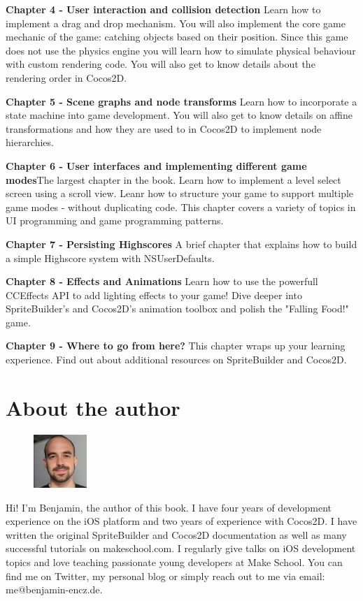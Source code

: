 \textbf{Chapter 4 - User interaction and collision detection}\newline
Learn how to implement a drag and drop mechanism. You will also implement the core game mechanic of the game: catching objects based on their position. Since this game does not use the physics engine you will learn how to simulate physical behaviour with custom rendering code. You will also get to know details about the rendering order in Cocos2D.


\textbf{Chapter 5 - Scene graphs and node transforms}\newline
Learn how to incorporate a state machine into game development. You will also get to know details on affine transformations and how they are used to in Cocos2D to implement node hierarchies.


\textbf{Chapter 6 - User interfaces and implementing different game
modes}\newline The largest chapter in the book. Learn how to implement a level select screen using a scroll view. Leanr how to structure your game to support multiple game modes - without duplicating code. This chapter covers a variety of topics in UI programming and game programming patterns.


\textbf{Chapter 7 - Persisting Highscores}\newline
A brief chapter that explains how to build a simple Highscore system with NSUserDefaults.


\textbf{Chapter 8 - Effects and Animations}\newline
Learn how to use the powerfull CCEffects API to add lighting effects to your game! Dive deeper into SpriteBuilder's and Cocos2D's animation toolbox and polish the "Falling Food!" game.


\textbf{Chapter 9 - Where to go from here?}\newline
This chapter wraps up your learning experience. Find out about additional resources on SpriteBuilder and Cocos2D.

\section{About the author}
\begin{figure}
    \includegraphics[width=0.18\textwidth]{images/Chapter1/benji.png}
\end{figure}
Hi! I'm Benjamin, the author of this book. I have four years of development experience on the iOS platform and two years of experience with Cocos2D.
I have written the original SpriteBuilder and Cocos2D documentation as well as many successful tutorials on makeschool.com. I regularly give talks on iOS development topics and love teaching passionate young developers at Make School. You can find me on Twitter, my personal blog or simply reach out to me via email: me@benjamin-encz.de.

